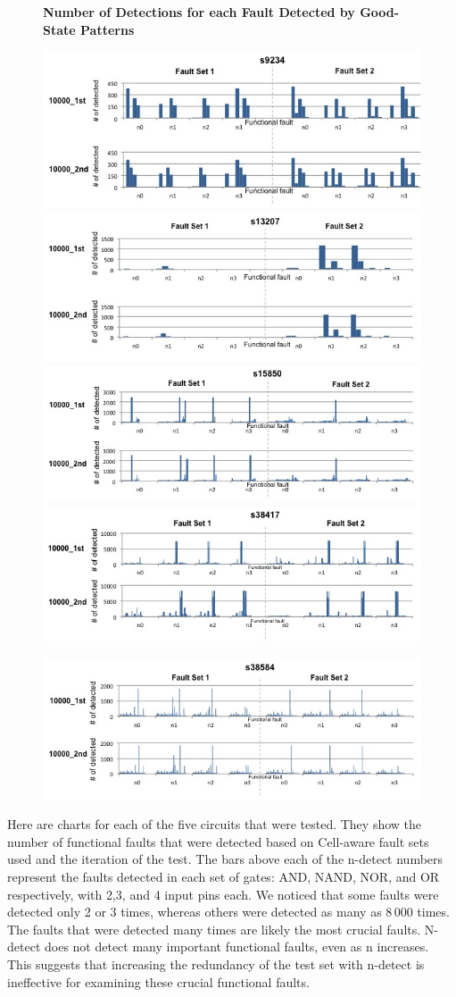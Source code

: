 \documentclass[12pt]{article}
\begin{document}
\begin{figure}[H]
\begin{center}
\textbf{Number of Detections for each Fault Detected by Good-State Patterns}\par\medskip
\end{center}
\begin{@twocolumntrue}
\includegraphics[scale=0.25,width=0.5\linewidth]{../detections_s9234.jpg}
\includegraphics[scale=0.25,width=0.5\linewidth]{../detections_s13207.jpg}\\ 
\includegraphics[scale=0.25,width=0.5\linewidth]{../detections_s15850.jpg}
\includegraphics[scale=0.25,width=0.5\linewidth]{../detections_s38417.jpg}
\end{@twocolumntrue}
\begin{center}
\includegraphics[scale=0.25,width=0.5\linewidth]{../detections_s38584.jpg}
\end{center}
\end{figure}


Here are charts for each of the five circuits that were tested. They show the number of functional faults that were detected based on Cell-aware fault sets used and the iteration of the test. The bars above each of the n-detect numbers represent the faults detected in each set of gates: AND, NAND, NOR, and OR respectively, with 2,3, and 4 input pins each. We noticed that some faults were detected only 2 or 3 times, whereas others were detected as many as 8\,000 times. The faults that were detected many times are likely the most crucial faults. N-detect does not detect many important functional faults, even as n increases. This suggests that increasing the redundancy of the test set with n-detect is ineffective for examining these crucial functional faults. 
\end{document}
